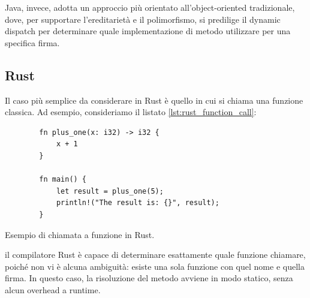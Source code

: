 Java, invece, adotta un approccio più orientato all'object-oriented tradizionale, dove, per supportare l'ereditarietà e il polimorfismo, si predilige il dynamic dispatch per determinare quale implementazione di metodo utilizzare per una specifica firma. 
\subsection{Rust}
Il caso più semplice da considerare in Rust è quello in cui si chiama una funzione classica. Ad esempio, consideriamo il listato \ref{lst:rust_function_call}:
\begin{listing}
    \begin{verbatim}
        fn plus_one(x: i32) -> i32 {
            x + 1
        }

        fn main() {
            let result = plus_one(5);
            println!("The result is: {}", result);
        }
    \end{verbatim}
    \caption{Esempio di chiamata a funzione in Rust.}
    \label{lst:rust_function_call}
\end{listing}
il compilatore Rust è capace di determinare esattamente quale funzione chiamare, poiché non vi è alcuna ambiguità: esiste una sola funzione con quel nome e quella firma. In questo caso, la risoluzione del metodo avviene in modo statico, senza alcun overhead a runtime.

